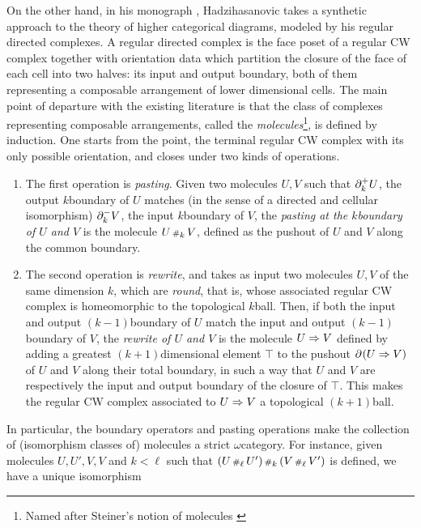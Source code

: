 On the other hand, in his monograph \cite{hadzihasanovic2024combinatorics}, Hadzihasanovic takes a synthetic approach to the theory of higher categorical diagrams, modeled by his regular directed complexes.
A regular directed complex is the face poset of a regular CW complex together with orientation data which partition the closure of the face of each cell into two halves: its input and output boundary, both of them representing a composable arrangement of lower dimensional cells.
The main point of departure with the existing literature is that the class of complexes representing composable arrangements, called the \emph{molecules}\footnote{Named after Steiner's notion of molecules \cite{steiner1993algebra}}, is defined by induction.
One starts from the point, the terminal regular CW complex with its only possible orientation, and closes under two kinds of operations.
\begin{enumerate}
    \item The first operation is \emph{pasting}. Given two molecules \( U, V \) such that \( \partial_{k}^{+} U \), the output \( k \)\nbd boundary of \( U \) matches (in the sense of a directed and cellular isomorphism) \( \partial_{k}^{-} V \), the input \( k \)\nbd boundary of \( V \), the \emph{pasting at the \( k \)\nbd boundary of \( U \) and \( V \)} is the molecule \( U \,{\scriptstyle\#}_{k}\, V \), defined as the pushout of \( U \) and \( V \) along the common boundary. 
    \item The second operation is \emph{rewrite}, and takes as input two molecules \( U, V \) of the same dimension \( k \), which are \emph{round}, that is, whose associated regular CW complex is homeomorphic to the topological \( k \)\nbd ball.
    Then, if both the input and output \( (k - 1) \)\nbd boundary of \( U \) match the input and output \( (k - 1) \)\nbd boundary of \( V \), the \emph{rewrite of \( U \) and \( V \)} is the molecule \( U \Rightarrow V \) defined by adding a greatest \( (k + 1) \)\nbd dimensional element \( \top \) to the pushout \( \partial_{}^{}(U \Rightarrow V) \) of \( U \) and \( V \) along their total boundary, in such a way that \( U \) and \( V \) are respectively the input and output boundary of the closure of \( \top \).
    This makes the regular CW complex associated to \( U \Rightarrow V \) a topological \( (k + 1) \)\nbd ball.
\end{enumerate}  
In particular, the boundary operators and pasting operations make the collection of (isomorphism classes of) molecules a strict \( \omega \)\nbd category.
For instance, given molecules \( U, U', V, V \) and \( k < \ell \) such that \( (U \,{\scriptstyle\#}_{\ell}\, U') \,{\scriptstyle\#}_{k}\, (V \,{\scriptstyle\#}_{\ell}\, V') \) is defined, we have a unique isomorphism
